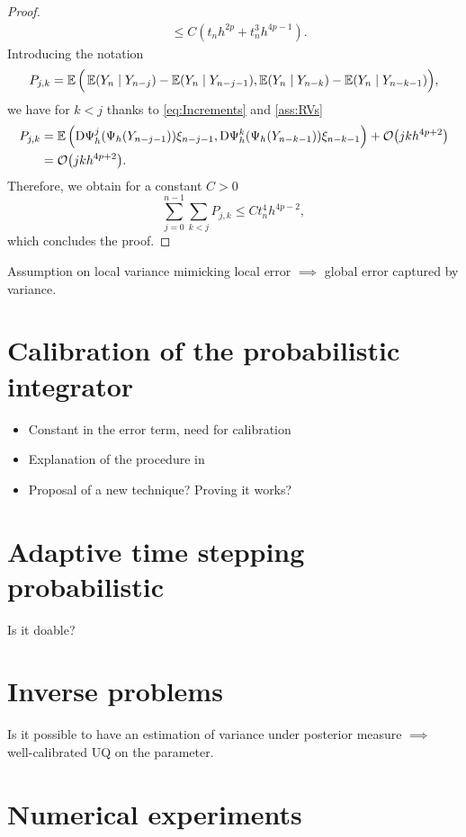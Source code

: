 \documentclass[10pt]{article}
\begin{document}
\begin{proof}
\begin{equation}
\begin{aligned}
		&\leq C(t_n h^{2p} + t_n^3 h^{4p-1}).
	\end{aligned}
	\end{equation}
	Introducing the notation
	\begin{equation}
		P_{j,k} = \operatorname{\mathbb{E}}\Big(\operatorname{\mathbb{E}}(Y_n \mid Y_{n-j}) - \operatorname{\mathbb{E}}(Y_n \mid Y_{n-j-1}), \operatorname{\mathbb{E}}(Y_n \mid Y_{n-k}) - \operatorname{\mathbb{E}}(Y_n \mid Y_{n-k-1})\Big),
	\end{equation}
	we have for $k < j$ thanks to \eqref{eq:Increments} and \cref{ass:RVs}
	\begin{equation}
	\begin{aligned}
		P_{j,k} &= \operatorname{\mathbb{E}}\Big(\mathrm{D}\Psi_h^j(\Psi_h(Y_{n-j-1}))\xi_{n-j-1}, \mathrm{D}\Psi_h^k(\Psi_h(Y_{n-k-1}))\xi_{n-k-1} \Big) + \mathcal{O}\big(jkh^{4p+2}\big) \\
		&= \mathcal{O}\big(jkh^{4p+2}\big).
	\end{aligned}
	\end{equation}
	Therefore, we obtain for a constant $C > 0$
	\begin{equation}
		\sum_{j=0}^{n-1} \sum_{k<j} P_{j, k} \leq Ct_n^4 h^{4p-2},
	\end{equation}
	which concludes the proof.
\end{proof}



\begin{theorem} Assumption on local variance mimicking local error $\implies$ global error captured by variance.
\end{theorem}

\section{Calibration of the probabilistic integrator}
\begin{itemize}[label=-]
	\item Constant in the error term, need for calibration
	\item Explanation of the procedure in \cite{CGS16}
	\item Proposal of a new technique? Proving it works?
\end{itemize}

\section{Adaptive time stepping probabilistic} Is it doable?

\section{Inverse problems} Is it possible to have an estimation of variance under posterior measure $\implies$ well-calibrated UQ on the parameter.

\section{Numerical experiments}





\end{document}
